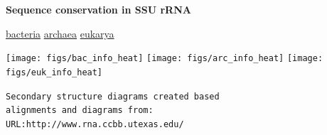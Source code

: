 \documentclass[landscape]{slides}
\begin{document}
\begin{slide}
\begin{center}

\textbf{Sequence conservation in SSU rRNA}
\end{center}
\vspace{0.5in}
\small
\hspace{1.5in}
\underline{bacteria}
\hspace{2.2in}
\underline{archaea}
\hspace{2.2in}
\underline{eukarya}

\begin{center}
\texttt{[image: figs/bac\_info\_heat]}
\texttt{[image: figs/arc\_info\_heat]}
\texttt{[image: figs/euk\_info\_heat]}
\end{center}

\begin{flushright}
\tiny{\texttt{Secondary structure diagrams created based}} \\
\tiny{\texttt{alignments and diagrams from:}} \\
\tiny{\texttt{URL:http://www.rna.ccbb.utexas.edu/}}
\end{flushright}
\vfill
\end{slide}

% 
\end{document}
